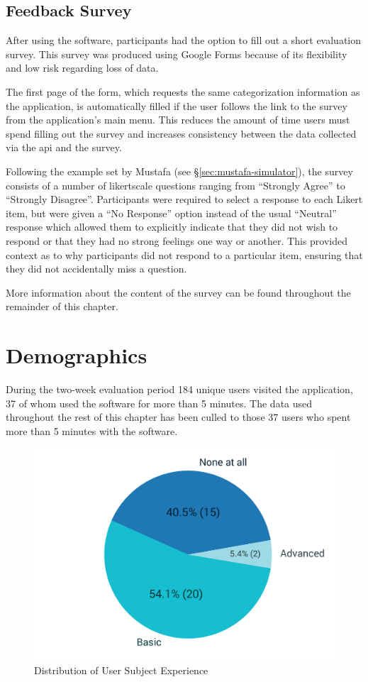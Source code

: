 \documentclass[bsc,twoside,singlespacing,parskip,logo,notimes,normalheadings]{infthesis}
\begin{document}
        \subsection{Feedback Survey}
        After using the software, participants had the option to fill
        out a short evaluation survey. This survey was produced using
        Google Forms\cite{googleforms} because of its flexibility and
        low risk regarding loss of data.

        The first page of the form, which requests the same
        categorization information as the application, is
        automatically filled if the user follows the link to the
        survey from the application's main menu. This reduces the
        amount of time users must spend filling out the survey and
        increases consistency between the data collected via the
        \gls{api} and the survey.

        Following the example set by Mustafa\cite{mustafa2010} (see
        \S\ref{sec:mustafa-simulator}), the survey consists of a
        number of \gls{likertscale} questions ranging from ``Strongly
        Agree'' to ``Strongly Disagree''. Participants were required to
        select a response to each Likert item, but were given a ``No
        Response'' option instead of the usual ``Neutral'' response
        which allowed them to explicitly indicate that they did not
        wish to respond or that they had no strong feelings one way or
        another. This provided context as to why participants did not
        respond to a particular item, ensuring that they did not
        accidentally miss a question.

        More information about the content of the survey can be found
        throughout the remainder of this chapter.

    \section{Demographics}\label{sec:demographics}
    
    During the two-week evaluation period 184 unique users visited the
    application, 37 of whom used the software for more than 5
    minutes. The data used throughout the rest of this chapter has
    been culled to those 37 users who spent more than 5 minutes with
    the software.

    \begin{figure}
      \vspace{-12mm}
        \includegraphics[width=.40\textwidth, trim=150 0 100 0]{img/experience_pie.pdf}
        \captionsetup{width=.38\textwidth, justification=centering}
        \caption{Distribution of User Subject Experience}\label{fig:demo-q1}
    \end{figure}
\end{document}
